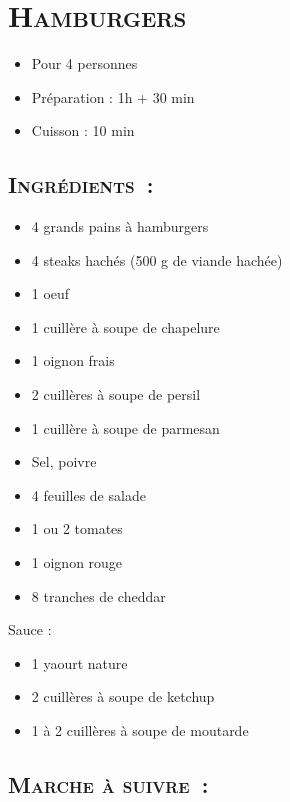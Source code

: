 \section[\normalsize{Hamburgers}]{\LARGE{\textsc{Hamburgers}}}		%


\begin{itemize}
\item Pour 4 personnes
\item Préparation : 1h + 30 min
\item Cuisson : 10 min
\end{itemize}

\subsection*{\textsc{Ingr\'edients~:}}

\begin{itemize}
\item 4 grands pains \`a hamburgers
\item 4 steaks hach\'es (500 g de viande hach\'ee)
\item 1 oeuf
\item 1 cuill\`ere \`a soupe de chapelure
\item 1 oignon frais
\item 2 cuill\`eres \`a soupe de persil
\item 1 cuill\`ere \`a soupe de parmesan
\item Sel, poivre
\item 4 feuilles de salade
\item 1 ou 2 tomates
\item 1 oignon rouge
\item 8 tranches de cheddar
\end{itemize}
Sauce :
\begin{itemize}
\item 1 yaourt nature
\item 2 cuill\`eres \`a soupe de ketchup
\item 1 \`a 2 cuill\`eres \`a soupe de moutarde
\end{itemize}


\subsection*{\textsc{Marche \`a suivre~:}}

